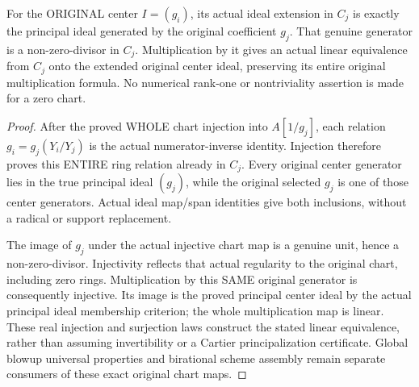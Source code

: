 \begin{theorem}
\label{algebra:actual-rees-center-principalization}
\leanok
For the ORIGINAL center $I=(g_i)$, its actual ideal extension in
$C_j$ is exactly the principal ideal generated by the original
coefficient $g_j$. That genuine generator is a non-zero-divisor
in $C_j$. Multiplication by it gives an actual linear equivalence
from $C_j$ onto the extended original center ideal, preserving its
entire original multiplication formula. No numerical rank-one or
nontriviality assertion is made for a zero chart.
\end{theorem}
\begin{proof}
After the proved WHOLE chart injection into $A[1/g_j]$, each relation
$g_i=g_j(Y_i/Y_j)$ is the actual numerator-inverse identity. Injection
therefore proves this ENTIRE ring relation already in $C_j$.
Every original center generator lies in the true principal ideal
$(g_j)$, while the original selected $g_j$ is one of those center
generators. Actual ideal map/span identities give both inclusions,
without a radical or support replacement.

The image of $g_j$ under the actual injective chart map is a genuine
unit, hence a non-zero-divisor. Injectivity reflects that actual
regularity to the original chart, including zero rings. Multiplication
by this SAME original generator is consequently injective. Its image
is the proved principal center ideal by the actual principal ideal
membership criterion; the whole multiplication map is linear.
These real injection and surjection laws construct the stated
linear equivalence, rather than assuming invertibility or a Cartier
principalization certificate. Global blowup universal properties and
birational scheme assembly remain separate consumers of these exact
original chart maps.
\end{proof}
